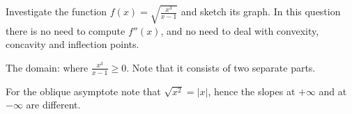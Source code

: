 
\begin{question}
Investigate the function $f(x)=\sqrt{\frac{x^3}{x-1}}$ and sketch its graph. In this question there is no need to compute $f''(x)$, and no need to deal with convexity, concavity and inflection points.
\end{question}

\begin{hint}
The domain: where $\frac{x^3}{x-1}\ge0$. Note that it consists of two separate parts.
\end{hint}

\begin{hint}
For the oblique asymptote note that $\sqrt{x^2}=|x|$, hence the slopes at $+\infty$ and at $-\infty$ are different.
\end{hint}


